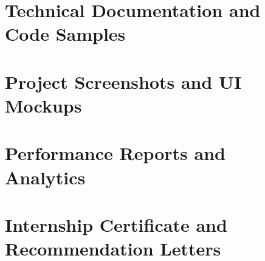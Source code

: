 \documentclass[a4paper, 11pt, oneside]{report}
\begin{document}

\appendix
\chapter{Technical Documentation and Code Samples}

\chapter{Project Screenshots and UI Mockups}

\chapter{Performance Reports and Analytics}

\chapter{Internship Certificate and Recommendation Letters}



\end{document}
